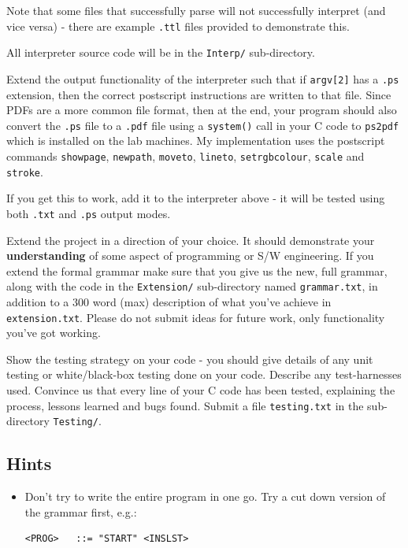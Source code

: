 \begin{exercise}
\noindent Note that some files that successfully parse will not
successfully interpret (and vice versa) - there are example \verb^.ttl^
files provided to demonstrate this.

\noindent All interpreter source code will be in the \verb^Interp/^ sub-directory.

\vspace*{1em}

\noindent Extend the output functionality of the
interpreter such that if \verb^argv[2]^ has a \verb^.ps^
extension, then the correct postscript instructions are written to that file.
 Since PDFs are a
more common file format, then at the end, your program should also convert the \verb^.ps^
file to a \verb^.pdf^ file using a \verb^system()^ call in your C code
to \verb^ps2pdf^ which is installed on the lab machines. 
My implementation uses the postscript commands \verb^showpage^,
\verb^newpath^, \verb^moveto^, \verb^lineto^, \verb^setrgbcolour^, \verb^scale^
and \verb^stroke^.

If you get this to work, add it to the interpreter above - it will be tested
using both \verb^.txt^ and \verb^.ps^ output modes.

\vspace*{1ex}

\noindent Extend the project in a direction of
your choice. It should demonstrate your {\bf understanding} of some aspect
of programming or S/W engineering. If you extend the formal grammar
make sure that you give us the new, full grammar, along with the code in
the \verb^Extension/^ sub-directory named \verb^grammar.txt^, in addition to
a $300$ word (max) description of what you've achieve in \verb^extension.txt^.
Please do not submit ideas for future work, only functionality you've got working.

\vspace*{1ex}

\noindent Show the testing strategy on your code -
you should give details of any
unit testing or white/black-box testing done on your code. Describe any
test-harnesses used. Convince us that every line of your C code has
been tested, explaining the process, lessons learned and bugs found.
Submit a file \verb^testing.txt^ in the sub-directory \verb^Testing/^.

\subsection*{Hints}
\begin{itemize}
\item Don't try to write the entire program in one go. Try a cut
down version of the grammar first, e.g.:
{\small
\begin{verbatim}
<PROG>   ::= "START" <INSLST>


\end{verbatim}}
\end{itemize}
\end{exercise}
